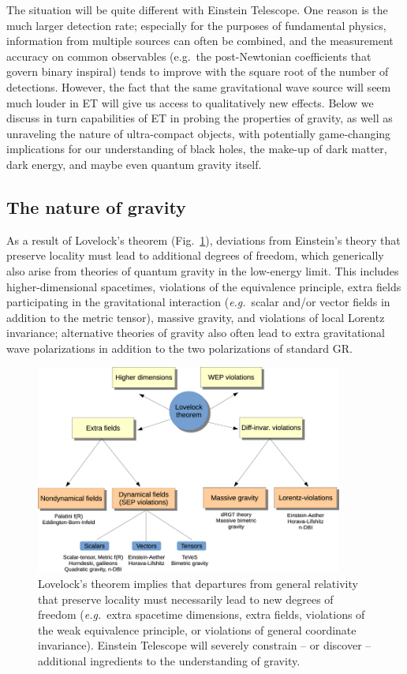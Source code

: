 The situation will be quite different with Einstein Telescope. One reason is the much 
larger detection rate; especially for the purposes of fundamental physics, information 
from multiple sources can often be combined, and the measurement accuracy on 
common observables (e.g.~the post-Newtonian coefficients that govern binary inspiral) 
tends to improve with the square root of the number of detections. However, the fact that
the same gravitational wave source will seem much louder in ET will give us access to 
qualitatively new effects. Below we discuss in turn capabilities of ET in 
probing the properties of gravity, as well as unraveling the nature of ultra-compact
objects, with potentially game-changing implications for our understanding of black holes, 
the make-up of dark matter, dark energy, and maybe even quantum gravity itself.

\subsection{The nature of gravity}

As a result of Lovelock's theorem (Fig.~\ref{fig:lovelock}), deviations from
Einstein's theory that preserve locality must lead to additional degrees of
freedom, which generically also arise from theories of quantum gravity in the
low-energy limit. This includes higher-dimensional spacetimes, violations of the equivalence principle,  
extra fields participating in the gravitational interaction 
(\emph{e.g.}~scalar and/or vector fields in addition to the metric tensor), 
massive gravity, and violations of local Lorentz invariance; alternative theories
of gravity also often lead to extra gravitational wave polarizations in addition 
to the two polarizations of standard GR.

\begin{figure}[h!]
\centering
\includegraphics[width=0.9\textwidth]{Figures/Lovelock.png}
\caption{Lovelock's theorem implies that departures from general relativity 
that preserve locality must necessarily lead to new degrees of freedom 
(\emph{e.g.}~extra spacetime dimensions, extra fields, violations of the
weak equivalence principle, or violations of general coordinate invariance). 
Einstein Telescope will severely constrain -- or discover -- additional
ingredients to the understanding of gravity.
}
\label{fig:lovelock}
\end{figure} 

